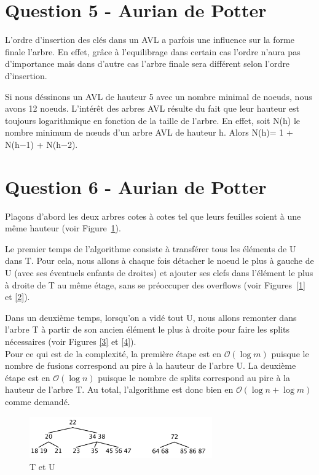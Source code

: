 \documentclass[10pt,a4paper]{article}
\begin{document}
\section*{Question 5 - Aurian de Potter}
L'ordre d'insertion des clés dans un AVL a parfois une influence sur la forme finale l'arbre. En effet, grâce à l'equilibrage dans certain cas l'ordre n'aura pas d'importance mais dans d'autre cas l'arbre finale sera différent selon l'ordre d'insertion.

Si nous déssinons un AVL de hauteur 5 avec un nombre minimal de noeuds, nous avons 12 noeuds. L’intérêt des arbres AVL résulte du fait que leur hauteur est toujours logarithmique en fonction de la taille de l’arbre. En effet, soit N(h) le nombre minimum de nœuds d’un arbre AVL de hauteur h. Alors N(h)= 1 + N(h−1) + N(h−2).
\section*{Question 6 - Aurian de Potter}
Plaçons d'abord les deux arbres cotes à cotes tel que leurs feuilles soient à une même hauteur (voir Figure~\ref{TU}).

Le premier temps de l'algorithme consiste à transférer tous les éléments de U dans T. Pour cela, nous allons à chaque fois détacher le noeud le plus à gauche de U (avec ses éventuels enfants de droites) et ajouter ses clefs dans l'élément le plus à droite de T au même étage, sans se préoccuper des overflows (voir Figures~\ref{1} et \ref{2}).

Dans un deuxième temps, lorsqu'on a vidé tout U, nous allons remonter dans l'arbre T à partir de son ancien élément le plus à droite pour faire les splits nécessaires (voir Figures \ref{3} et \ref{4}).\\

Pour ce qui est de la complexité, la première étape est en $\mathcal{O}(\log m)$ puisque le nombre de fusions correspond au pire à la hauteur de l'arbre U. La deuxième étape est en $\mathcal{O}(\log n)$ puisque le nombre de splits correspond au pire à la hauteur de l'arbre T. Au total, l'algorithme est donc bien en $\mathcal{O}(\log n + \log m)$ comme demandé.

\begin{figure}[!h]
	\begin{center}
		\includegraphics[width=0.7\textwidth]{TU.png}
		\caption{T et U}
		\label{TU}
	\end{center}
\end{figure}
\end{document}
